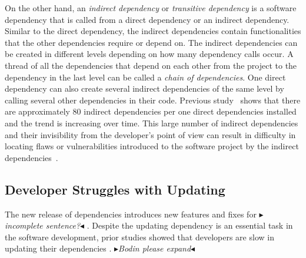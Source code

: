 \documentclass[conference]{IEEEtran}
\newcommand{\boxedtext}[1]{\fbox{\scriptsize\bfseries\textsf{#1}}}
\newcommand{\nota}[2]{
	\boxedtext{#1}
	{\small$\blacktriangleright$\emph{\textsl{#2}}$\blacktriangleleft$}
}
\newcommand{\todo}[1]{{\color{red}\nota{TODO}{#1}}}
\begin{document}
	On the other hand, an \textit{indirect dependency} or \textit{transitive dependency} is a software dependency that is called from a direct dependency or an indirect dependency. Similar to the direct dependency, the indirect dependencies contain functionalities that the other dependencies require or depend on. The indirect dependencies can be created in different levels depending on how many dependency calls occur. A thread of all the dependencies that depend on each other from the project to the dependency in the last level can be called a \textit{chain of dependencies}. 
	One direct dependency can also create several indirect dependencies of the same level by calling several other dependencies in their code. Previous study~\cite{Zimmermann2019} shows that there are approximately 80 indirect dependencies per one direct dependencies installed and the trend is increasing over time. This large number of indirect dependencies and their invisibility from the developer's point of view can result in difficulty in locating flaws or vulnerabilities introduced to the software project by the indirect dependencies~\cite{Cox2019}.
	
	\subsection{Developer Struggles with Updating}
	The new release of dependencies introduces new features and fixes for \todo{incomplete sentence?}. 
	Despite the updating dependency is an essential task in the software development, prior studies showed that developers are slow in updating their dependencies \citep{Robbes:2012, Hora:2015, Sawant2016, Bavota:2015, Ihara:2017}. \todo{Bodin please expand}
	
\end{document}
